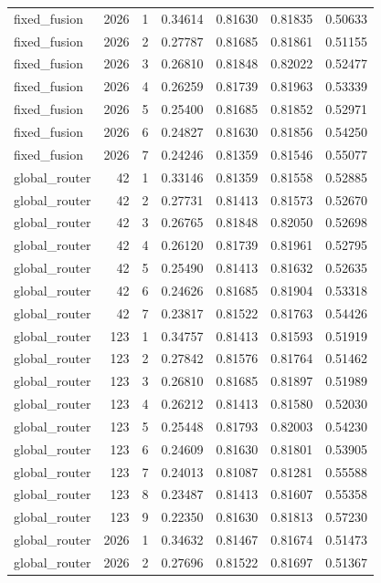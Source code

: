 \begin{tabular}{lrrrrrr}
fixed_fusion & 2026 & 1 & 0.34614 & 0.81630 & 0.81835 & 0.50633 \\
fixed_fusion & 2026 & 2 & 0.27787 & 0.81685 & 0.81861 & 0.51155 \\
fixed_fusion & 2026 & 3 & 0.26810 & 0.81848 & 0.82022 & 0.52477 \\
fixed_fusion & 2026 & 4 & 0.26259 & 0.81739 & 0.81963 & 0.53339 \\
fixed_fusion & 2026 & 5 & 0.25400 & 0.81685 & 0.81852 & 0.52971 \\
fixed_fusion & 2026 & 6 & 0.24827 & 0.81630 & 0.81856 & 0.54250 \\
fixed_fusion & 2026 & 7 & 0.24246 & 0.81359 & 0.81546 & 0.55077 \\
global_router & 42 & 1 & 0.33146 & 0.81359 & 0.81558 & 0.52885 \\
global_router & 42 & 2 & 0.27731 & 0.81413 & 0.81573 & 0.52670 \\
global_router & 42 & 3 & 0.26765 & 0.81848 & 0.82050 & 0.52698 \\
global_router & 42 & 4 & 0.26120 & 0.81739 & 0.81961 & 0.52795 \\
global_router & 42 & 5 & 0.25490 & 0.81413 & 0.81632 & 0.52635 \\
global_router & 42 & 6 & 0.24626 & 0.81685 & 0.81904 & 0.53318 \\
global_router & 42 & 7 & 0.23817 & 0.81522 & 0.81763 & 0.54426 \\
global_router & 123 & 1 & 0.34757 & 0.81413 & 0.81593 & 0.51919 \\
global_router & 123 & 2 & 0.27842 & 0.81576 & 0.81764 & 0.51462 \\
global_router & 123 & 3 & 0.26810 & 0.81685 & 0.81897 & 0.51989 \\
global_router & 123 & 4 & 0.26212 & 0.81413 & 0.81580 & 0.52030 \\
global_router & 123 & 5 & 0.25448 & 0.81793 & 0.82003 & 0.54230 \\
global_router & 123 & 6 & 0.24609 & 0.81630 & 0.81801 & 0.53905 \\
global_router & 123 & 7 & 0.24013 & 0.81087 & 0.81281 & 0.55588 \\
global_router & 123 & 8 & 0.23487 & 0.81413 & 0.81607 & 0.55358 \\
global_router & 123 & 9 & 0.22350 & 0.81630 & 0.81813 & 0.57230 \\
global_router & 2026 & 1 & 0.34632 & 0.81467 & 0.81674 & 0.51473 \\
global_router & 2026 & 2 & 0.27696 & 0.81522 & 0.81697 & 0.51367 \\

\end{tabular}

